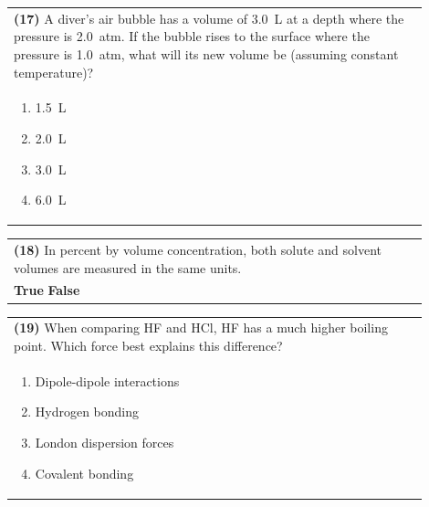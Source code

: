 \documentclass{article}
\begin{document}
{{\noindent\begin{tabular}{|p{0.9\linewidth}|}
\hline
\textbf{(17)} A diver's air bubble has a volume of 3.0~L at a depth where the pressure is 2.0~atm. If the bubble rises to the surface where the pressure is 1.0~atm, what will its new volume be (assuming constant temperature)?\\[0.2cm]
\begin{minipage}[t]{0.85\linewidth}
\begin{enumerate}[label=\alph*.]
\item 1.5~L
\item 2.0~L
\item 3.0~L
\item 6.0~L
\end{enumerate}
\end{minipage}\\[0.2cm]
\hline
\end{tabular}

\vspace{0.2cm}
\noindent\begin{tabular}{|p{0.9\linewidth}|}
\hline
\textbf{(18)} In percent by volume concentration, both solute and solvent volumes are measured in the same units.\\[0.2cm]
\textbf{True} \hspace{1cm} \textbf{False}\\[0.2cm]
\hline
\end{tabular}

\vspace{0.2cm}
\noindent\begin{tabular}{|p{0.9\linewidth}|}
\hline
\textbf{(19)} When comparing HF and HCl, HF has a much higher boiling point. Which force best explains this difference?\\[0.2cm]
\begin{minipage}[t]{0.85\linewidth}
\begin{enumerate}[label=\alph*.]
\item Dipole-dipole interactions
\item Hydrogen bonding
\item London dispersion forces
\item Covalent bonding
\end{enumerate}
\end{minipage}\\[0.2cm]
\hline
\end{tabular}

}}
\end{document}
